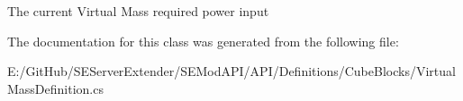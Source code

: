 The current Virtual Mass required power input 



The documentation for this class was generated from the following file\+:\begin{DoxyCompactItemize}
\item 
E\+:/\+Git\+Hub/\+S\+E\+Server\+Extender/\+S\+E\+Mod\+A\+P\+I/\+A\+P\+I/\+Definitions/\+Cube\+Blocks/Virtual\+Mass\+Definition.\+cs\end{DoxyCompactItemize}
